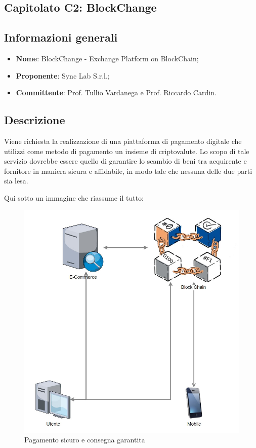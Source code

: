 \documentclass[11pt]{article}
\begin{document}
\subsection{Capitolato C2: BlockChange}

    \subsection{Informazioni generali}
    \begin{itemize}
        \item \textbf{Nome}: BlockChange - Exchange Platform on BlockChain;
        \item \textbf{Proponente}: Sync Lab S.r.l.;
        \item \textbf{Committente}: Prof. Tullio Vardanega e Prof. Riccardo Cardin.
    \end{itemize}
    
    \subsection{Descrizione}
    Viene richiesta la realizzazione di una piattaforma di pagamento digitale che utilizzi come metodo di pagamento un insieme di criptovalute. Lo scopo di tale servizio dovrebbe essere quello di garantire lo scambio di beni tra acquirente e fornitore in maniera sicura e affidabile, in modo tale che nessuna delle due parti sia lesa.
    
    Qui sotto un immagine che riassume il tutto:
    
    \begin{figure}[h!]
        \centering
        \includegraphics[scale=0.4]{Res/SyncLab.png}
        \caption{Pagamento sicuro e consegna garantita}
        \label{SyncLab}
    \end{figure}
    
\end{document}
